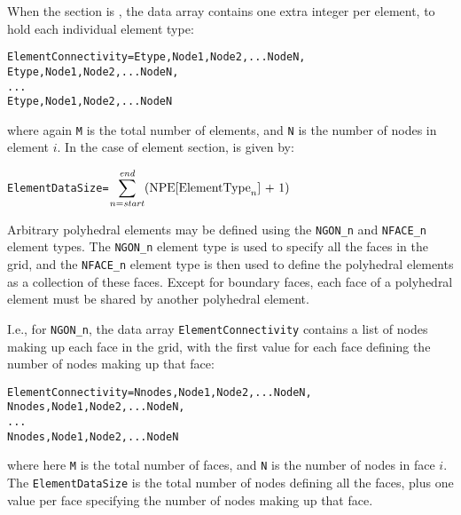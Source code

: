 When the section  is , the data array
 contains one extra integer per element,
to hold each individual element type:
\begin{alltt}
  ElementConnectivity = Etype, Node1, Node2, ... NodeN,
                        Etype, Node1, Node2, ... NodeN,
                        ...
                        Etype, Node1, Node2, ... NodeN
\end{alltt}
where again \texttt{M} is the total number of elements, and
\texttt{N} is the number of nodes in element $i$.
In the case of  element section,  is
given by:
\begin{alltt}
  ElementDataSize = \(\displaystyle\sum\sb{n=\mbox{\scriptsize\ital{start}}}\sp{\mbox{\scriptsize\ital{end}}} (\mbox{NPE[ElementType}\sb{n}\mbox{] + 1})\)
\end{alltt}

Arbitrary polyhedral elements may be defined using the \texttt{NGON\_n}
and \texttt{NFACE\_n} element types.
The \texttt{NGON\_n} element type is used to specify all the faces
in the grid, and the \texttt{NFACE\_n} element type is then
used to define the polyhedral elements as a collection of these faces.
Except for boundary faces, each face of a polyhedral element must be
shared by another polyhedral element.

I.e., for \texttt{NGON\_n}, the data array \texttt{ElementConnectivity}
contains a list of nodes making up each face
in the grid, with the first value for each face defining the number of
nodes making up that face:
\begin{alltt}
  ElementConnectivity = Nnodes, Node1, Node2, ... NodeN,
                        Nnodes, Node1, Node2, ... NodeN,
                        ...
                        Nnodes, Node1, Node2, ... NodeN
\end{alltt}
where here \texttt{M} is the total number of faces, and
\texttt{N} is the number of nodes in face $i$.
The \texttt{ElementDataSize} is the total number of nodes defining all
the faces, plus one value per face specifying the number of nodes making
up that face.

